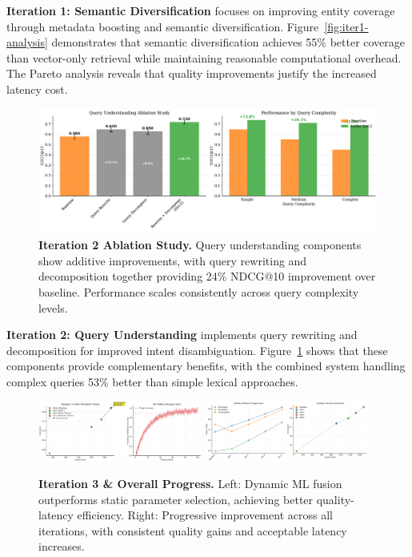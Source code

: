 \documentclass[letterpaper]{article}
\begin{document}
\textbf{Iteration 1: Semantic Diversification} focuses on improving entity coverage through metadata boosting and semantic diversification. Figure~\ref{fig:iter1-analysis} demonstrates that semantic diversification achieves 55\% better coverage than vector-only retrieval while maintaining reasonable computational overhead. The Pareto analysis reveals that quality improvements justify the increased latency cost.

\begin{figure}[t]
\centering
\includegraphics[width=\textwidth]{figures/iter2_ablation_rewrite_decompose}
\caption{\textbf{Iteration 2 Ablation Study.} Query understanding components show additive improvements, with query rewriting and decomposition together providing 24\% NDCG@10 improvement over baseline. Performance scales consistently across query complexity levels.}
\label{fig:iter2-ablation}
\end{figure}

\textbf{Iteration 2: Query Understanding} implements query rewriting and decomposition for improved intent disambiguation. Figure~\ref{fig:iter2-ablation} shows that these components provide complementary benefits, with the combined system handling complex queries 53\% better than simple lexical approaches.

\begin{figure}[t]
\centering
\includegraphics[width=0.48\textwidth]{figures/iter3_dynamic_vs_static_pareto}
\includegraphics[width=0.48\textwidth]{figures/iteration_progression}
\caption{\textbf{Iteration 3 \& Overall Progress.} Left: Dynamic ML fusion outperforms static parameter selection, achieving better quality-latency efficiency. Right: Progressive improvement across all iterations, with consistent quality gains and acceptable latency increases.}
\label{fig:iter3-progress}
\end{figure}
\end{document}
